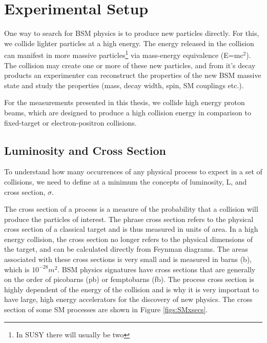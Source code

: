 
\chapter{Experimental Setup}
\label{sec:ExpSetup}
One way to search for BSM physics is to produce new particles directly.  
For this, we collide lighter particles at a high energy.  
The energy released in the collision can manifest in more massive particles\footnote{In SUSY there will usually be two} via mass-energy equivalence (E=m$\mathrm{c^2}$).
The collision may create one or more of these new particles, and from it's decay products an experimenter can reconstruct the properties of the new BSM massive state 
and study the properties (mass, decay width, spin, SM couplings etc.).  

For the measurements presented in this thesis, we collide high energy proton beams,  
which are designed to produce a high collision energy in comparison to fixed-target or electron-positron collisions.    
   
\section{Luminosity and Cross Section}
\label{sec:LumiXsec}
To understand how many occurrences of any physical process to expect in a set of collisions, we need to define at a minimum the concepts of luminosity, L, and cross section, $\sigma$.

The cross section of a process is a measure of the probability that a collision will produce the particles of interest.  
The phrase cross section refers to the physical cross section of a classical target and is thus measured in units of area.  
In a high energy collision, the cross section no longer refers to the physical dimensions of the target, and can be calculated directly from Feynman diagrams.  
The areas associated with these cross sections is very small and is measured in barns (b), which is $10^{-28} m^2$.  
BSM physics signatures have cross sections that are generally on the order of picobarns (pb) or femptobarns (fb).  
The process cross section is highly dependent of the energy of the collision and is why it is very important to have large, high energy accelerators for the discovery of new physics.  
The cross section of some SM processes are shown in Figure \ref{figs:SMxsecs}.


